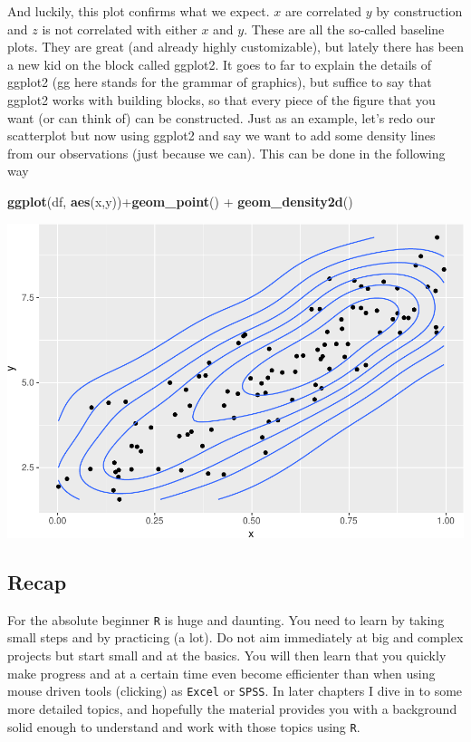 \documentclass[]{article}
\newenvironment{Shaded}{\begin{snugshade}}{\end{snugshade}}
\newcommand{\KeywordTok}[1]{\textcolor[rgb]{0.13,0.29,0.53}{\textbf{{#1}}}}
\newcommand{\StringTok}[1]{\textcolor[rgb]{0.31,0.60,0.02}{{#1}}}
\newcommand{\NormalTok}[1]{{#1}}
\theoremstyle{definition}
\theoremstyle{definition}
\theoremstyle{definition}
\theoremstyle{remark}
\begin{document}
And luckily, this plot confirms what we expect. \(x\) are correlated
\(y\) by construction and \(z\) is not correlated with either \(x\) and
\(y\). These are all the so-called baseline plots. They are great (and
already highly customizable), but lately there has been a new kid on the
block called ggplot2. It goes to far to explain the details of ggplot2
(gg here stands for the grammar of graphics), but suffice to say that
ggplot2 works with building blocks, so that every piece of the figure
that you want (or can think of) can be constructed. Just as an example,
let's redo our scatterplot but now using ggplot2 and say we want to add
some density lines from our observations (just because we can). This can
be done in the following way

\begin{Shaded}
\begin{Highlighting}[]
\KeywordTok{ggplot}\NormalTok{(df, }\KeywordTok{aes}\NormalTok{(x,y))+}\KeywordTok{geom_point}\NormalTok{() +}\StringTok{ }\KeywordTok{geom_density2d}\NormalTok{()}
\end{Highlighting}
\end{Shaded}

\includegraphics{./unnamed-chunk-30-1.pdf}

\subsection{Recap}\label{recap}

For the absolute beginner \texttt{R} is huge and daunting. You need to
learn by taking small steps and by practicing (a lot). Do not aim
immediately at big and complex projects but start small and at the
basics. You will then learn that you quickly make progress and at a
certain time even become efficienter than when using mouse driven tools
(clicking) as \texttt{Excel} or \texttt{SPSS}. In later chapters I dive
in to some more detailed topics, and hopefully the material provides you
with a background solid enough to understand and work with those topics
using \texttt{R}.
\end{document}
